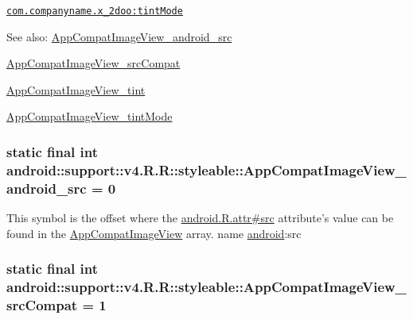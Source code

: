 {\tt \hyperlink{classandroid_1_1support_1_1v4_1_1_r_1_1styleable_335facec4026e5e7aefa8541f5121cc2}{com.companyname.x\_\-2doo:tintMode}}

\begin{Desc}
\item[See also:]\hyperlink{classandroid_1_1support_1_1v4_1_1_r_1_1styleable_dfb6d5b58f6d14c12d268d2b97125be9}{AppCompatImageView\_\-android\_\-src} 

\hyperlink{classandroid_1_1support_1_1v4_1_1_r_1_1styleable_bc7f130ffbc0a6a871090cae86e7110f}{AppCompatImageView\_\-srcCompat} 

\hyperlink{classandroid_1_1support_1_1v4_1_1_r_1_1styleable_5a59812d29ed00b03e0455481efa5f47}{AppCompatImageView\_\-tint} 

\hyperlink{classandroid_1_1support_1_1v4_1_1_r_1_1styleable_335facec4026e5e7aefa8541f5121cc2}{AppCompatImageView\_\-tintMode} \end{Desc}
\hypertarget{classandroid_1_1support_1_1v4_1_1_r_1_1styleable_dfb6d5b58f6d14c12d268d2b97125be9}{
\subsubsection[{AppCompatImageView\_\-android\_\-src}]{\setlength{\rightskip}{0pt plus 5cm}static final int android::support::v4.R.R::styleable::AppCompatImageView\_\-android\_\-src = 0}}
\label{classandroid_1_1support_1_1v4_1_1_r_1_1styleable_dfb6d5b58f6d14c12d268d2b97125be9}


This symbol is the offset where the \hyperlink{}{android.R.attr\#src} attribute's value can be found in the \hyperlink{classandroid_1_1support_1_1v4_1_1_r_1_1styleable_6785f800ea84c577c1f75fe389b114f0}{AppCompatImageView} array.  name \hyperlink{namespaceandroid}{android}:src \hypertarget{classandroid_1_1support_1_1v4_1_1_r_1_1styleable_bc7f130ffbc0a6a871090cae86e7110f}{
\subsubsection[{AppCompatImageView\_\-srcCompat}]{\setlength{\rightskip}{0pt plus 5cm}static final int android::support::v4.R.R::styleable::AppCompatImageView\_\-srcCompat = 1}}
\label{classandroid_1_1support_1_1v4_1_1_r_1_1styleable_bc7f130ffbc0a6a871090cae86e7110f}


